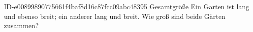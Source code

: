 \begin{exercise}
      {ID-e00899890775661f4baf8d16c87fcc09abc48395}
      {Gesamtgröße}
  \ifproblem\problem
    Ein Garten ist  lang und ebenso breit; ein anderer  lang
    und  breit. Wie groß sind beide Gärten zusammen?
  \fi
\end{exercise}
